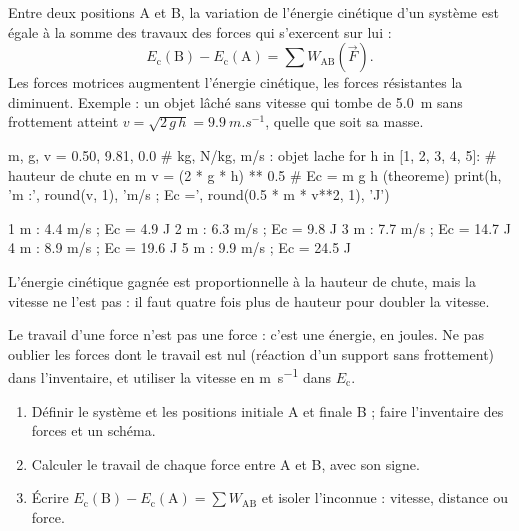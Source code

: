 \par{}
\begin{loi}
Entre deux positions A et B, la variation de l'énergie cinétique d'un système est égale à la somme des travaux des forces
qui s'exercent sur lui :
\[E_\mathrm{c}(\mathrm{B})-E_\mathrm{c}(\mathrm{A})=\sum W_{\mathrm{AB}}(\vec{F}).\]
Les forces motrices augmentent l'énergie cinétique, les forces résistantes la diminuent. Exemple : un objet lâché sans vitesse
qui tombe de \qty{5,0}{m} sans frottement atteint $v=\sqrt{2\,g\,h}=\qty{9,9}{m.s^{-1}}$, quelle que soit sa masse.
\end{loi}
\par{}
\begin{python}
m, g, v = 0.50, 9.81, 0.0          # kg, N/kg, m/s : objet lache
for h in [1, 2, 3, 4, 5]:          # hauteur de chute en m
    v = (2 * g * h) ** 0.5         # Ec = m g h (theoreme)
    print(h, 'm :', round(v, 1), 'm/s ; Ec =', round(0.5 * m * v**2, 1), 'J')
\end{python}
\begin{console}
1 m : 4.4 m/s ; Ec = 4.9 J
2 m : 6.3 m/s ; Ec = 9.8 J
3 m : 7.7 m/s ; Ec = 14.7 J
4 m : 8.9 m/s ; Ec = 19.6 J
5 m : 9.9 m/s ; Ec = 24.5 J
\end{console}
\noindent{} L'énergie cinétique gagnée est proportionnelle à la hauteur de chute, mais la vitesse ne l'est pas : il faut
quatre fois plus de hauteur pour doubler la vitesse.
\begin{attention}
Le travail d'une force n'est pas une force : c'est une énergie, en joules. Ne pas oublier les forces dont le travail est nul (réaction
d'un support sans frottement) dans l'inventaire, et utiliser la vitesse en \unit{m.s^{-1}} dans $E_\mathrm{c}$.
\end{attention}
\begin{savoirfaire}
\begin{enumerate}
\item Définir le système et les positions initiale A et finale B ; faire l'inventaire des forces et un schéma.
\item Calculer le travail de chaque force entre A et B, avec son signe.
\item Écrire $E_\mathrm{c}(\mathrm{B})-E_\mathrm{c}(\mathrm{A})=\sum W_{\mathrm{AB}}$ et isoler l'inconnue : vitesse, distance ou force.
\end{enumerate}
\end{savoirfaire}
